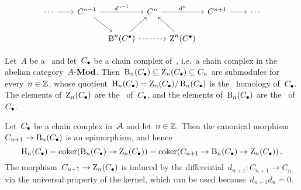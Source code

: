 \begin{definition}
\begin{enumerate}
\[\begin{tikzcd}[column sep = tiny]
            \dotsb
            \arrow{rr}
          & {}
          & C^{n-1}
            \arrow{rr}[above]{d^{n-1}}
            \arrow{dr}
          & {}
          & C^n
            \arrow{rr}[above]{d^n}
          & {}
          & C^{n+1}
            \arrow{rr}
          & {}
          & \dotsb
          \\
            {}
          & {}
          & {}
          & \Bl^n(\Cccc)
            \arrow{ur}
            \arrow[dashed]{rr}
          & {}
          & \Zl^n(\Cccc)
            \arrow{ul}
          & {}
          & {}
          & {}
        \end{tikzcd}
      \]
  \end{enumerate}
\end{definition}


\begin{example*}
  Let~$A$ be a~{\kalg} and let~$C_\bullet$ be a chain complex of~{}, i.e.\ a chain complex in the abelian category~$\text{$A$-$\mathbf{Mod}$}$.
  Then~$\operatorname{B}_n(C_\bullet) \subseteq \operatorname{Z}_n(C_\bullet) \subseteq C_n$ are submodules for every~$n \in \mathbb{Z}$, whose quotient~$\operatorname{H}_n(C_\bullet) = \operatorname{Z}_n(C_\bullet)/\operatorname{B}_n(C_\bullet)$ is the~ homology of~$C_\bullet$.
  The elements of~$\operatorname{Z}_n(C_\bullet)$ are the~\emph{} of~$C_\bullet$, and the elements of~$\operatorname{B}_n(C_\bullet)$ are the~\emph{} of~$C_\bullet$.
\end{example*}


\begin{remark*}
  \label{Hn as cokernel with Cn}
  Let~$C_\bullet$ be a chain complex in~$\mathcal{A}$ and let~$n \in \mathbb{Z}$.
  Then the canonical morphism~$C_{n+1} \to \operatorname{B}_n(C_\bullet)$ is an epimorphism, and hence
  \[
      \operatorname{H}_n(C_\bullet)
    = \operatorname{coker}( \operatorname{B}_n(C_\bullet) \to \operatorname{Z}_n(C_\bullet) )
    = \operatorname{coker}( C_{n+1} \to \operatorname{B}_n(C_\bullet) \to \operatorname{Z}_n(C_\bullet) ) \,.
  \]
  The morphism~$C_{n+1} \to \operatorname{Z}_n(C_\bullet)$ is induced by the differential~$d_{n+1} \colon C_{n+1} \to C_n$ via the universal property of the kernel, which can be used because~$d_{n+1} d_n = 0$.
\end{remark*}


